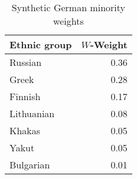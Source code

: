 \begin{table}[t]

\caption{\label{tab:sc_weights}Synthetic German minority weights}
\centering
\begin{tabular}{lr}
\toprule
Ethnic group & $W$-Weight\\
\midrule
Russian & 0.36\\
Greek & 0.28\\
Finnish & 0.17\\
Lithuanian & 0.08\\
Khakas & 0.05\\
Yakut & 0.05\\
Bulgarian & 0.01\\
\bottomrule
\end{tabular}
\end{table}